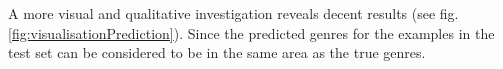 \documentclass[a4paper, 11pt]{article}
\begin{document}
    A more visual and qualitative investigation reveals decent results (see fig. \ref{fig:visualisationPrediction}). Since the predicted genres for the examples in the test set can be considered to be in the same area as the true genres. 

\pagebreak

\end{document}
